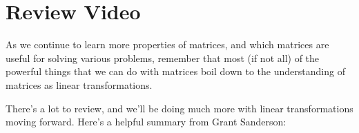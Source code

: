\documentclass{ximera}
\begin{document}
\section*{Review Video}

\begin{remark}

    As we continue to learn more properties of matrices, and which matrices are useful for solving various problems, remember that most (if not all) of the powerful things that we can do with matrices boil down to the understanding of matrices as linear transformations.

\end{remark}

There's a lot to review, and we'll be doing much more with linear transformations moving forward. Here's a helpful summary from Grant Sanderson:

\end{document}
